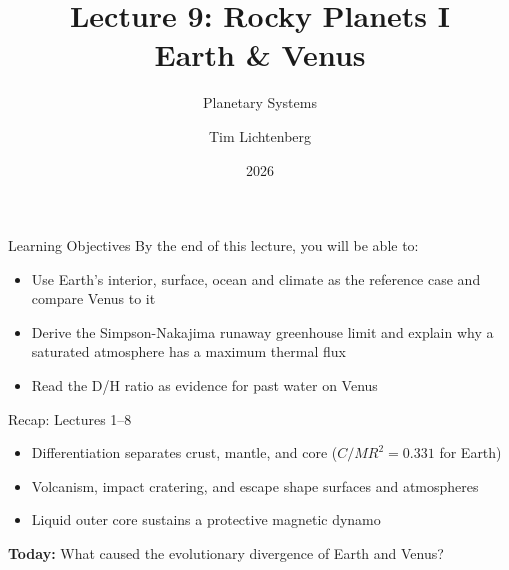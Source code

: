 \documentclass[aspectratio=169, 11pt]{beamer}
\title[Lecture 9: Earth \& Venus]{Lecture 9: Rocky Planets I\\Earth \& Venus}
\subtitle{Planetary Systems}
\author[L9]{Tim Lichtenberg}
\institute{Kapteyn Astronomical Institute\\University of Groningen}
\date{2026}
\begin{document}
\begin{frame}
  \titlepage
\end{frame}

\begin{frame}{Learning Objectives}
  By the end of this lecture, you will be able to:
  \vskip8pt
  \begin{itemize}
    \item Use Earth's interior, surface, ocean and climate as the reference case and compare Venus to it
    \item Derive the Simpson-Nakajima runaway greenhouse limit and explain why a saturated atmosphere has a maximum thermal flux
    \item Read the D/H ratio as evidence for past water on Venus
  \end{itemize}
\end{frame}

\begin{frame}{Recap: Lectures 1--8}
  \begin{itemize}
    \item Differentiation separates crust, mantle, and core ($C/MR^2 = 0.331$ for Earth)
    \item Volcanism, impact cratering, and escape shape surfaces and atmospheres
    \item Liquid outer core sustains a protective magnetic dynamo
  \end{itemize}
  \vskip8pt
  \textbf{Today:} What caused the evolutionary divergence of Earth and Venus?
\end{frame}

\begin{frame}
\end{frame}

\begin{frame}
\end{frame}
\end{document}
